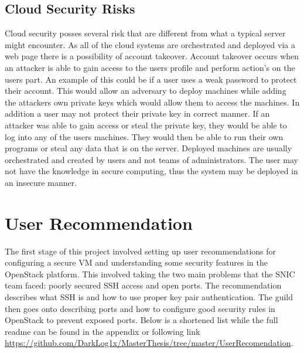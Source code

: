 \documentclass[12pt]{article}
\begin{document}
\subsection{Cloud Security Risks}
Cloud security posses several risk that are different from what a typical server might encounter. As all of the cloud systems are orchestrated and deployed via a web page there is a possibility of account takeover. Account takeover occurs when an attacker is able to gain access to the users profile and perform action's on the users part. An example of this could be if a user uses a weak password to protect their account. This would allow an adversary to deploy machines while adding the attackers own private keys which would allow them to access the machines. In addition a user may not protect their private key in correct manner. If an attacker was able to gain access or steal the private key, they would be able to log into any of the users machines. They would then be able to run their own programs or steal any data that is on the server. Deployed machines are usually orchestrated and created by users and not teams of administrators. The user may not have the knowledge in secure computing, thus the system may be deployed in an insecure manner.

\section{User Recommendation}
The first stage of this project involved setting up user recommendations for configuring a secure VM and understanding some security features in the OpenStack platform. This involved taking the two main problems that the SNIC team faced: poorly secured SSH access and open ports. The recommendation describes what SSH is and how to use proper key pair authentication. The guild then goes onto describing ports and how to configure good security rules in OpenStack to prevent exposed ports. Below is a shortened list while the full readme can be found in the appendix or following link \href{https://github.com/DarkLog1x/MasterThesis/tree/master/UserRecomendation}{https://github.com/DarkLog1x/MasterThesis/tree/master/UserRecomendation}.
\end{document}
